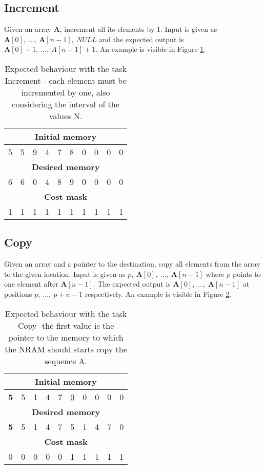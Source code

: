 \subsection{Increment}
Given an array $\textbf{A}$, increment all its elements by 1. Input is given as $\textbf{A}[0],\ \dots,\ \textbf{A}[n-1],\ \textit{NULL}$ and the expected output is $\textbf{A}[0] + 1,\ \dots,\ A[n-1] + 1$. An example is visible in Figure \ref{fig:increment-example}.
\begin{table}[h!]
	\centering
	\begin{tabular}{|c|c|c|c|c|c|c|c|c|c|}
		\hline
		\multicolumn{10}{|c|}{\textbf{Initial memory}} \\ \hline
		5 & 5 & 9 & 4 & 7 & 8 & 0 & 0 & 0 & 0 \\ \hline\hline\hline
		\multicolumn{10}{|c|}{\textbf{Desired memory}} \\ \hline
		6 & 6 & 0 & 4 & 8 & 9 & 0 & 0 & 0 & 0 \\ \hline\hline\hline
		\multicolumn{10}{|c|}{\textbf{Cost mask}} \\ \hline
		1 & 1 & 1 & 1 & 1 & 1 & 1 & 1 & 1 & 1 \\ \hline
	\end{tabular}
	\caption{Expected behaviour with the task Increment - each element must be incremented by one, also considering the interval of the values N.}
	\label{fig:increment-example}
\end{table}
\FloatBarrier
\subsection{Copy}
Given an array and a pointer to the destination, copy all elements from the array to the given location. Input is given as $p,\ \textbf{A}[0],\ \dots,\ \textbf{A}[n-1]$ where $p$ points to one element after $\textbf{A}[n-1]$. The expected output is $\textbf{A}[0],\ \dots,\ \textbf{A}[n-1]$ at positions $p,\ \dots,\ p+n-1$ respectively. An example is visible in Figure \ref{fig:copy-example}.
\begin{table}[h!]
	\centering
	\begin{tabular}{|c|c|c|c|c|c|c|c|c|c|}
		\hline
		\multicolumn{10}{|c|}{\textbf{Initial memory}} \\ \hline
		\textbf{5} & 5 & 1 & 4 & 7 & \underline{0} & 0 & 0 & 0 & 0 \\ \hline\hline\hline
		\multicolumn{10}{|c|}{\textbf{Desired memory}} \\ \hline
		\textbf{5} & 5 & 1 & 4 & 7 & 5 & 1 & 4 & 7 & 0 \\ \hline\hline\hline
		\multicolumn{10}{|c|}{\textbf{Cost mask}} \\ \hline
		0 & 0 & 0 & 0 & 0 & 1 & 1 & 1 & 1 & 1 \\ \hline
	\end{tabular}
	\caption{Expected behaviour with the task Copy -the first value is the pointer to the memory to which the NRAM should starts copy the sequence A. }
	\label{fig:copy-example}
\end{table}
\FloatBarrier

